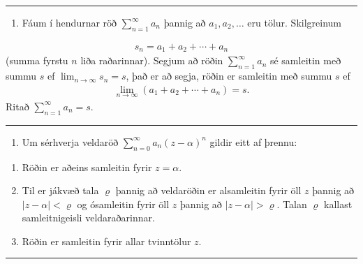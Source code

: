 \documentclass[a4paper,10pt,icelandic]{sphinxmanual}
\begin{document}
\bigskip\hrule\bigskip

\begin{enumerate}
%
\item {} 
Fáum í hendurnar röð \(\sum_{n=1}^\infty a_n\) þannig að \(a_1, a_2, \ldots\) eru tölur. Skilgreinum

\end{enumerate}
\begin{equation*}
\begin{split}s_n=a_1+a_2+\cdots+a_n\end{split}
\end{equation*}
(summa fyrstu \(n\) liða raðarinnar). Segjum að röðin \(\sum_{n=1}^\infty a_n\) sé samleitin með summu \(s\) ef \(\lim_{n\rightarrow\infty}s_n=s\), það er að segja, röðin er samleitin með summu \(s\) ef
\begin{equation*}
\begin{split}\lim_{n\rightarrow \infty}(a_1+a_2+\cdots+a_n)=s.\end{split}
\end{equation*}
Ritað \(\sum_{n=1}^\infty a_n=s\).


\bigskip\hrule\bigskip

\begin{enumerate}
%
\setcounter{enumi}{1}
\item {} 
Um sérhverja veldaröð \(\sum_{n=0}^\infty a_n(z-\alpha)^n\) gildir eitt af þrennu:

\end{enumerate}
\begin{enumerate}
%
\item {} 
Röðin er aðeins samleitin fyrir \(z=\alpha\).

\item {} 
Til er jákvæð tala \(\varrho\) þannig að veldaröðin er alsamleitin fyrir öll \(z\) þannig að \(|z-\alpha|<\varrho\) og ósamleitin fyrir öll \(z\) þannig að \(|z-\alpha|>\varrho\). Talan \(\varrho\) kallast samleitnigeisli veldaraðarinnar.

\item {} 
Röðin er samleitin fyrir allar tvinntölur \(z\).

\end{enumerate}


\bigskip\hrule\bigskip
\end{document}
